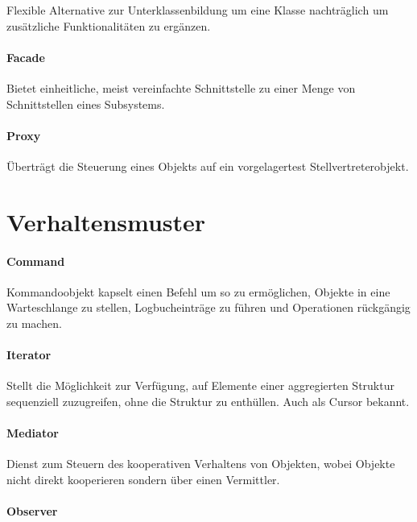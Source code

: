 Flexible Alternative zur Unterklassenbildung um eine Klasse nachträglich um
zusätzliche Funktionalitäten zu ergänzen.

\paragraph{Facade}\label{facade}

Bietet einheitliche, meist vereinfachte Schnittstelle zu einer Menge von
Schnittstellen eines Subsystems.

\paragraph{Proxy}\label{proxy}

Überträgt die Steuerung eines Objekts auf ein vorgelagertest
Stellvertreterobjekt.

\section{Verhaltensmuster}\label{verhaltensmuster}

\paragraph{Command}\label{command}

Kommandoobjekt kapselt einen Befehl um so zu ermöglichen, Objekte in eine
Warteschlange zu stellen, Logbucheinträge zu führen und Operationen rückgängig zu
machen.

\paragraph{Iterator}\label{iterator}

Stellt die Möglichkeit zur Verfügung, auf Elemente einer aggregierten Struktur
sequenziell zuzugreifen, ohne die Struktur zu enthüllen. Auch als Cursor
bekannt.

\paragraph{Mediator}\label{mediator}

Dienst zum Steuern des kooperativen Verhaltens von Objekten, wobei Objekte
nicht direkt kooperieren sondern über einen Vermittler.

\paragraph{Observer}\label{observer}

